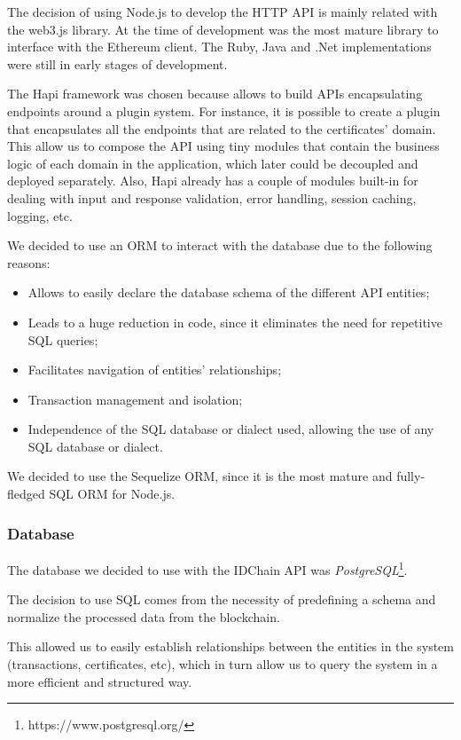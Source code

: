 The decision of using Node.js to develop the HTTP API is mainly related with the web3.js library.
At the time of development was the most mature library to interface with the Ethereum client.
The Ruby, Java and .Net implementations were still in early stages of development.

The Hapi framework was chosen because allows to build APIs encapsulating endpoints around a plugin system.
For instance, it is possible to create a plugin that encapsulates all the endpoints that are related to the certificates' domain.
This allow us to compose the API using tiny modules that contain the business logic of each domain in the application, which later could be decoupled and deployed separately.
Also, Hapi already has a couple of modules built-in for dealing with input and response validation, error handling, session caching, logging, etc.

We decided to use an \ac{ORM} to interact with the database due to the following reasons:

\begin{itemize}
  \item Allows to easily declare the database schema of the different API entities;
  \item Leads to a huge reduction in code, since it eliminates the need for repetitive SQL queries;
  \item Facilitates navigation of entities' relationships;
  \item Transaction management and isolation;
  \item Independence of the SQL database or dialect used, allowing the use of any SQL database or dialect.
\end{itemize}

We decided to use the Sequelize ORM, since it is the most mature and fully-fledged SQL ORM for Node.js.

\subsubsection{Database}

The database we decided to use with the IDChain API was \textit{PostgreSQL}\footnote{https://www.postgresql.org/}.

The decision to use SQL comes from the necessity of predefining a schema and normalize the processed data from the blockchain.

This allowed us to easily establish relationships between the entities in the system (transactions, certificates, etc), which in turn allow us to query the system in a more efficient and structured way.

